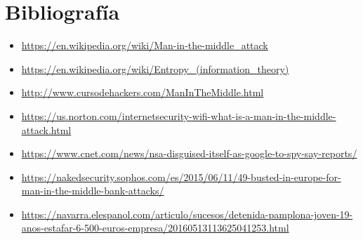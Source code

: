 \documentclass[11pt,a4paper]{article}
\begin{document}
\section{Bibliografía}
\begin{itemize}
    \item \url{https://en.wikipedia.org/wiki/Man-in-the-middle_attack}
    \item \url{https://en.wikipedia.org/wiki/Entropy_(information_theory)}
    \item \url{http://www.cursodehackers.com/ManInTheMiddle.html}
    \item \url{https://us.norton.com/internetsecurity-wifi-what-is-a-man-in-the-middle-attack.html}
    \item \url{https://www.cnet.com/news/nsa-disguised-itself-as-google-to-spy-say-reports/}
    \item \url{https://nakedsecurity.sophos.com/es/2015/06/11/49-busted-in-europe-for-man-in-the-middle-bank-attacks/}
    \item \url{https://navarra.elespanol.com/articulo/sucesos/detenida-pamplona-joven-19-anos-estafar-6-500-euros-empresa/20160513113625041253.html}
\end{itemize}
\end{document}
